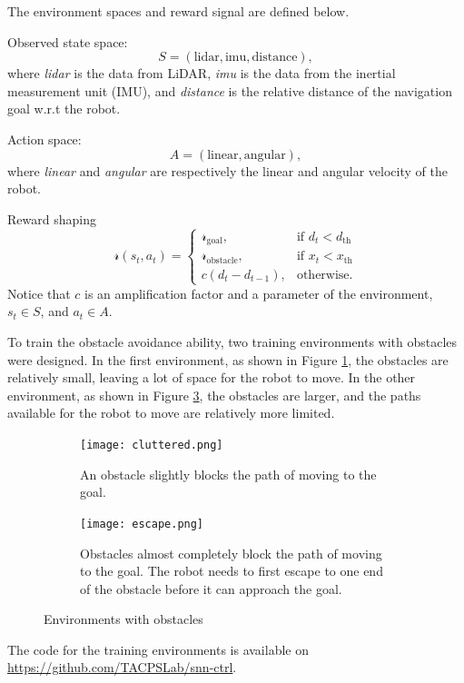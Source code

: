 {
\setlength{\parindent}{0pt}
\setlength{\parskip}{1.5ex}

The environment spaces and reward signal are defined below.

Observed state space:
\begin{equation*}
    S = (\text{lidar}, \text{imu}, \text{distance}),
\end{equation*}
where \textit{lidar} is the data from LiDAR, \textit{imu} is the data from 
 the inertial measurement unit (IMU), and \textit{distance} is the relative distance of the navigation goal w.r.t the robot.

Action space:
\begin{equation*}
    A = (\text{linear}, \text{angular}),
\end{equation*}
where \textit{linear} and \textit{angular} are respectively the linear and angular velocity of the robot.

Reward shaping
\begin{equation*}
    \mathcal{r}(s_t, a_t) = \begin{cases}
    \mathcal{r}_\text{goal}, &\text{if $d_t < d_\text{th}$}\\
    \mathcal{r}_\text{obstacle}, &\text{if $x_t < x_\text{th}$}\\
    c (d_t - d_{t-1}), &\text{otherwise.}
    \end{cases}
\end{equation*}
Notice that $c$ is an amplification factor and a parameter of the environment, $s_t \in S$, and $a_t \in A$.

}

To train the obstacle avoidance ability, two training environments with obstacles were designed. In the first environment, as shown in Figure \ref{fig:cluttered}, the obstacles are relatively small, leaving a lot of space for the robot to move. In the other environment, as shown in Figure \ref{fig:escape}, the obstacles are larger, and the paths available for the robot to move are relatively more limited.

\begin{figure}[htbp]
\centering
\begin{subfigure}[b]{0.49\textwidth}
   \centering
   \texttt{[image: cluttered.png]}
   \caption{An obstacle slightly blocks the path of moving to the goal.}
   \label{fig:cluttered}
\end{subfigure}
\begin{subfigure}[b]{0.49\textwidth}
   \centering
   \texttt{[image: escape.png]}
   \caption{Obstacles almost completely block the path of moving to the goal. The robot needs to first escape to one end of the obstacle before it can approach the goal.}
   \label{fig:escape}
\end{subfigure}
\caption{Environments with obstacles}
\end{figure}

The code for the training environments is available on \url{https://github.com/TACPSLab/snn-ctrl}.
